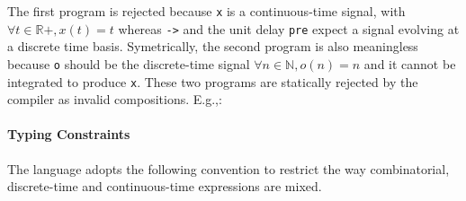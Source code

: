 \documentclass[11pt,titlepage,twoside]{report}
\newcommand{\bR}{\mathbb{R}}
\newcommand{\bN}{\mathbb{N}}
\begin{document}
The first program is rejected because \texttt{x} is a continuous-time
signal, with $\forall t \in \bR+, x(t) = t$ whereas \texttt{->} and
the unit delay \texttt{pre} expect a signal evolving at a discrete
time basis. Symetrically, the second program is also meaningless
because \verb-o- should be the discrete-time signal $\forall n \in
\bN, o(n) = n$ and it cannot be integrated to produce \verb-x-.
These two programs
are statically rejected by the compiler as invalid
compositions. E.g.,: \chklistingerr{}

\paragraph{Typing Constraints}

\newcommand{\AnyKind}{\mathtt{A}}
\newcommand{\NodeKind}{\mathtt{D}}
\newcommand{\HybridKind}{\mathtt{C}}

The language adopts the following convention to restrict the
way combinatorial, discrete-time and continuous-time expressions are mixed.
\end{document}
